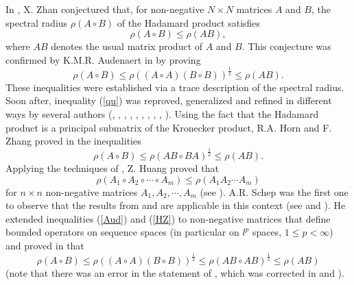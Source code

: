 \documentclass[12pt, reqno]{amsart}
\theoremstyle{definition}
\theoremstyle{remark}
\numberwithin{equation}{section}
\newcommand{\be}{\begin{equation}}
\newcommand{\ee}{\end{equation}}
\begin{document}
In \cite{Zh09}, X. Zhan conjectured that, for non-negative $N\times N$ matrices $A$ and $B$, the spectral radius $\rho (A\circ B)$ of the Hadamard product satisfies
\be
\rho (A\circ B) \le \rho (AB),
\label{qu}
\ee
where $AB$ denotes the usual matrix product of $A$ and $B$. This conjecture was confirmed by K.M.R. Audenaert in \cite{Au10}
by proving
\be
\rho (A\circ B) \le \rho ((A\circ A)(B\circ B)) ^{\frac{1}{2}}\le \rho (AB).
\label{Aud}
\ee
These inequalities were established via a trace description of the spectral radius.
Soon after, inequality (\ref{qu}) was reproved, generalized and refined in different ways by
several authors (\cite{HZ10},  \cite{Hu11}, \cite{S11}, \cite{Sc11}, \cite{P12}, \cite{CZ15}, \cite{DP16}, \cite{P17}, \cite{P17+}, \cite{BP21}).
Using the fact that the Hadamard product is a principal submatrix of
the Kronecker product, R.A. Horn and F. Zhang  proved in \cite{HZ10} the inequalities
\be
\rho (A\circ B) \le \rho (AB\circ BA)^{\frac{1}{2}}\le \rho (AB).
\label{HZ}
\ee
Applying the techniques of \cite{HZ10}, Z.  Huang proved that
\be
\rho (A_1 \circ A_2 \circ \cdots \circ A_m) \le \rho (A_1 A_2 \cdots A_m)
\label{Hu}
\ee
for $n\times n$ non-negative matrices $A_1, A_2, \cdots, A_m$ (see \cite{Hu11}).  A.R. Schep was the first one to observe that the results from \cite{DP05} and \cite{P06} are applicable in this context (see \cite{S11} and \cite{Sc11}). He extended inequalities (\ref{Aud}) and (\ref{HZ}) to non-negative matrices that define bounded
operators on sequence spaces (in particular on $l^p$ spaces, $1\le p <\infty$) and proved in
\cite[Theorem 2.7]{S11}  that
\be
\rho (A\circ B) \le \rho ((A\circ A)(B\circ B))^{\frac{1}{2}}\le  \rho (AB\circ AB)^{\frac{1}{2}}\le \rho (AB)
\label{Sproved}
\ee
(note that there was an error in the statement of \cite[Theorem 2.7]{S11}, which was corrected in \cite{Sc11} and \cite{P12}).
\end{document}
